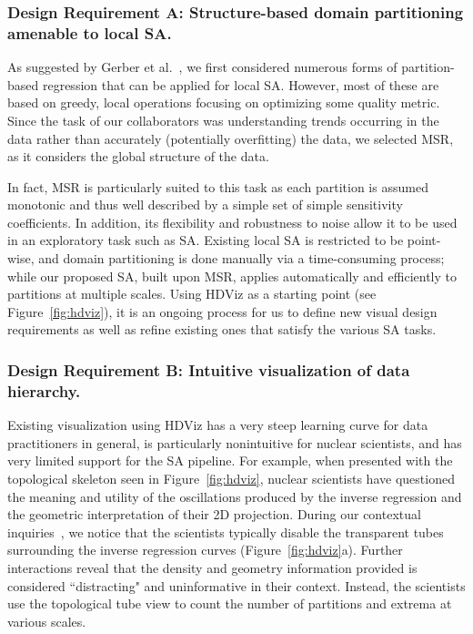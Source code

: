 \subsubsection{Design Requirement A: Structure-based domain partitioning amenable to local SA.}
As suggested by Gerber et al.~\cite{GerberRubelBremer2011}, we first considered numerous forms of partition-based regression that can be applied for local SA.
%
However, most of these are based on greedy, local operations focusing on optimizing some quality metric.
%
Since the task of our collaborators was understanding trends occurring in the data rather than accurately (potentially overfitting) the data, we selected MSR, as it considers the global structure of the data.

In fact, MSR is particularly suited to this task as each partition is assumed monotonic and thus well described by a simple set of simple sensitivity coefficients.
%
In addition, its flexibility and robustness to noise allow it to be used in an exploratory task such as SA.
%
Existing local SA is restricted to be point-wise, and domain partitioning is done manually via a time-consuming process; while our proposed SA, built upon MSR, applies automatically and efficiently to partitions at multiple scales.
%
Using HDViz as a starting point (see Figure~\ref{fig:hdviz}), it is an ongoing process for us to define new visual design requirements as well as refine existing ones that satisfy the various SA tasks.


\subsubsection{Design Requirement B: Intuitive visualization of data hierarchy.}
Existing visualization using HDViz has a very steep learning curve for data practitioners in general, is particularly nonintuitive for nuclear scientists, and has very limited support for the SA pipeline.
%
For example, when presented with the topological skeleton seen in Figure~\ref{fig:hdviz}, nuclear scientists have questioned the meaning and utility of the oscillations produced by the inverse regression and the geometric interpretation of their 2D projection.
%
During our contextual inquiries~\cite{HoltzblattJones1993}, we notice that the scientists typically disable the transparent tubes surrounding the inverse regression curves (Figure~\ref{fig:hdviz}a).
%
Further interactions reveal that the density and geometry information provided is considered ``distracting" and uninformative in their context. Instead, the scientists use the topological tube view to count the number of partitions and extrema at various scales.

